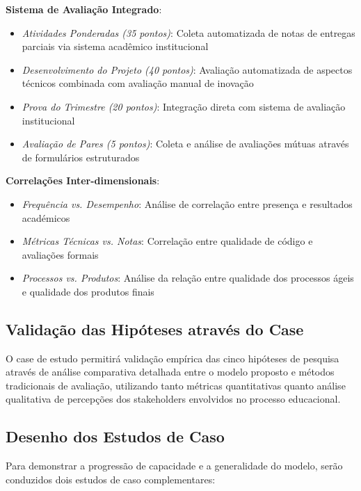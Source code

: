 \documentclass[12pt,a4paper]{article}
\begin{document}
\textbf{Sistema de Avaliação Integrado}:
\begin{itemize}
  \item \textit{Atividades Ponderadas (35 pontos)}: Coleta automatizada de notas de entregas parciais via sistema acadêmico institucional
  \item \textit{Desenvolvimento do Projeto (40 pontos)}: Avaliação automatizada de aspectos técnicos combinada com avaliação manual de inovação
  \item \textit{Prova do Trimestre (20 pontos)}: Integração direta com sistema de avaliação institucional
  \item \textit{Avaliação de Pares (5 pontos)}: Coleta e análise de avaliações mútuas através de formulários estruturados
\end{itemize}

\textbf{Correlações Inter-dimensionais}:
\begin{itemize}
  \item \textit{Frequência vs. Desempenho}: Análise de correlação entre presença e resultados académicos
  \item \textit{Métricas Técnicas vs. Notas}: Correlação entre qualidade de código e avaliações formais
  \item \textit{Processos vs. Produtos}: Análise da relação entre qualidade dos processos ágeis e qualidade dos produtos finais
\end{itemize}

\subsection{Validação das Hipóteses através do Case}

O case de estudo permitirá validação empírica das cinco hipóteses de pesquisa
através de análise comparativa detalhada entre o modelo proposto e métodos
tradicionais de avaliação, utilizando tanto métricas quantitativas quanto
análise qualitativa de percepções dos stakeholders envolvidos no processo
educacional.

\subsection{Desenho dos Estudos de Caso}

Para demonstrar a progressão de capacidade e a generalidade do modelo, serão
conduzidos dois estudos de caso complementares:
\end{document}
